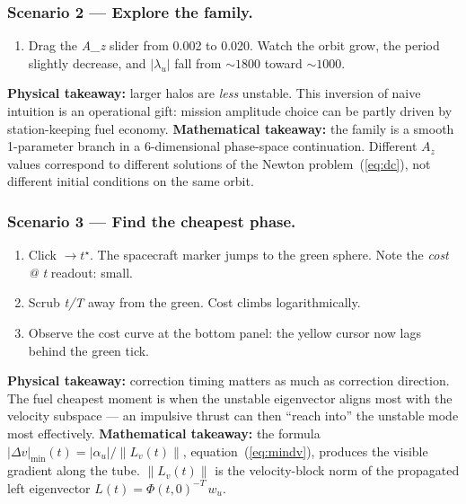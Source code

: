 \documentclass[11pt,a4paper]{article}
\begin{document}
\subsubsection*{Scenario 2 --- Explore the family.}
\begin{enumerate}[leftmargin=*]
  \item Drag the \emph{A\_z} slider from 0.002 to 0.020. Watch the orbit grow, the period slightly decrease, and $|\lambda_u|$ fall from $\sim 1800$ toward $\sim 1000$.
\end{enumerate}
\textbf{Physical takeaway:} larger halos are \emph{less} unstable. This inversion of naive intuition is an operational gift: mission amplitude choice can be partly driven by station-keeping fuel economy.
\textbf{Mathematical takeaway:} the family is a smooth 1-parameter branch in a 6-dimensional phase-space continuation. Different $A_z$ values correspond to different solutions of the Newton problem~(\ref{eq:dc}), not different initial conditions on the same orbit.

\subsubsection*{Scenario 3 --- Find the cheapest phase.}
\begin{enumerate}[leftmargin=*]
  \item Click $\to t^\star$. The spacecraft marker jumps to the green sphere. Note the \emph{cost @ t} readout: small.
  \item Scrub \emph{t/T} away from the green. Cost climbs logarithmically.
  \item Observe the cost curve at the bottom panel: the yellow cursor now lags behind the green tick.
\end{enumerate}
\textbf{Physical takeaway:} correction timing matters as much as correction direction. The fuel cheapest moment is when the unstable eigenvector aligns most with the velocity subspace --- an impulsive thrust can then ``reach into'' the unstable mode most effectively.
\textbf{Mathematical takeaway:} the formula $|\Delta v|_{\min}(t) = |\alpha_u|/\|L_v(t)\|$, equation~(\ref{eq:mindv}), produces the visible gradient along the tube. $\|L_v(t)\|$ is the velocity-block norm of the propagated left eigenvector $L(t) = \Phi(t,0)^{-T}\,w_u$.
\end{document}
